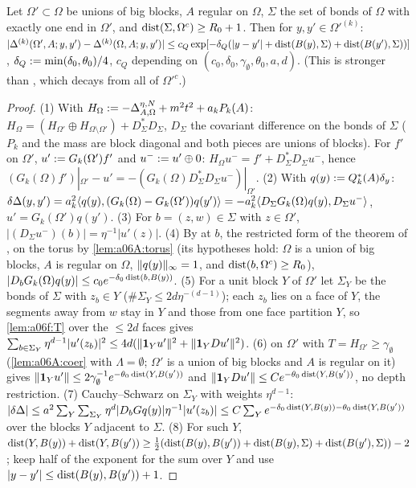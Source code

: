 \begin{lemma}\label{lem:a06f:Q2}
Let $\Omega'\subset\Omega$ be unions of big blocks, $A$ regular on $\Omega$, $\Sigma$ the set of bonds of $\Omega$ with exactly one end in $\Omega'$, and $\operatorname{dist}(\Sigma,\Omega^c)\ge R_0+1$. Then for $y,y'\in\Omega'^{(k)}$: $|\Delta^{(k)}(\Omega',A;y,y')-\Delta^{(k)}(\Omega,A;y,y')|\le c_Q\exp[-\delta_Q(|y-y'|+\operatorname{dist}(B(y),\Sigma)+\operatorname{dist}(B(y'),\Sigma))]$, $\delta_Q:=\min(\delta_0,\theta_0)/4$, $c_Q$ depending on $(c_0,\delta_0,\gamma_\emptyset,\theta_0,a,d)$. (This is stronger than \cite[(2.29)]{Ba1}, which decays from all of $\Omega'^c$.)
\end{lemma}

\begin{proof}
(1) With $H_\Omega:=-\Delta^{\eta,N}_{A,\Omega}+m^2t^2+a_kP_k(A)$: $H_\Omega=(H_{\Omega'}\oplus H_{\Omega\setminus\Omega'})+D_\Sigma^*D_\Sigma$, $D_\Sigma$ the covariant difference on the bonds of $\Sigma$ ($P_k$ and the mass are block diagonal and both pieces are unions of blocks). For $f'$ on $\Omega'$, $u':= G_k(\Omega')f'$ and $u^-:= u'\oplus0$: $H_\Omega u^-=f'+D_\Sigma^*D_\Sigma u^-$, hence $(G_k(\Omega)f')|_{\Omega'}-u'=-(G_k(\Omega)D_\Sigma^*D_\Sigma u^-)|_{\Omega'}$. (2) With $q(y):= Q_k^*(A)\delta_y$: $\delta\Delta(y,y')=a_k^2\langle q(y),(G_k(\Omega)-G_k(\Omega'))q(y')\rangle=-a_k^2\langle D_\Sigma G_k(\Omega)q(y),D_\Sigma u^-\rangle$, $u'=G_k(\Omega')q(y')$. (3) For $b=(z,w)\in\Sigma$ with $z\in\Omega'$, $|(D_\Sigma u^-)(b)|=\eta^{-1}|u'(z)|$. (4) By \cite[(2.25)]{Ba1} at $b$, the restricted form of the theorem of \cite{Ba4}, on the torus by \cref{lem:a06A:torus} (its hypotheses hold: $\Omega$ is a union of big blocks, $A$ is regular on $\Omega$, $\lVert q(y)\rVert_\infty=1$, and $\operatorname{dist}(b,\Omega^c)\ge R_0$), $|D_bG_k(\Omega)q(y)|\le c_0e^{-\delta_0\operatorname{dist}(b,B(y))}$. (5) For a unit block $Y$ of $\Omega'$ let $\Sigma_Y$ be the bonds of $\Sigma$ with $z_b\in Y$ ($\#\Sigma_Y\le2d\eta^{-(d-1)}$); each $z_b$ lies on a face of $Y$, the segments away from $w$ stay in $Y$ and those from one face partition $Y$, so \cref{lem:a06f:T} over the $\le2d$ faces gives $\sum_{b\in\Sigma_Y}\eta^{d-1}|u'(z_b)|^2\le4d(\lVert \mathbf 1_Yu'\rVert^2+\lVert \mathbf 1_YDu'\rVert^2)$. (6)  on $\Omega'$ with $T=H_{\Omega'}\ge\gamma_\emptyset$ (\cref{lem:a06A:coer} with $\Lambda=\emptyset$; $\Omega'$ is a union of big blocks and $A$ is regular on it) gives $\lVert \mathbf 1_Yu'\rVert\le2\gamma_\emptyset^{-1}e^{-\theta_0\operatorname{dist}(Y,B(y'))}$ and $\lVert \mathbf 1_YDu'\rVert\le Ce^{-\theta_0\operatorname{dist}(Y,B(y'))}$, no depth restriction. (7) Cauchy--Schwarz on $\Sigma_Y$ with weights $\eta^{d-1}$: $|\delta\Delta|\le a^2\sum_Y\sum_{\Sigma_Y}\eta^d|D_bGq(y)|\eta^{-1}|u'(z_b)|\le C\sum_Ye^{-\delta_0\operatorname{dist}(Y,B(y))-\theta_0\operatorname{dist}(Y,B(y'))}$ over the blocks $Y$ adjacent to $\Sigma$. (8) For such $Y$, $\operatorname{dist}(Y,B(y))+\operatorname{dist}(Y,B(y'))\ge\frac12(\operatorname{dist}(B(y),B(y'))+\operatorname{dist}(B(y),\Sigma)+\operatorname{dist}(B(y'),\Sigma))-2$; keep half of the exponent for the sum over $Y$ and use $|y-y'|\le\operatorname{dist}(B(y),B(y'))+1$.
\end{proof}

